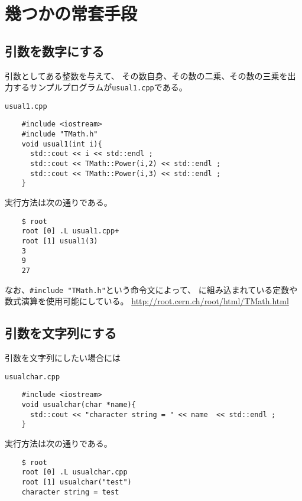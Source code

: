 \clearpage
 \section{幾つかの常套手段}


  \subsection{引数を数字にする}
  引数としてある整数を与えて、
  その数自身、その数の二乗、その数の三乗を出力するサンプルプログラムが\verb|usual1.cpp|である。
  \begin{itembox}{\texttt{usual1.cpp}}
\begin{verbatim}
	#include <iostream>
	#include "TMath.h"
	void usual1(int i){
	  std::cout << i << std::endl ;
	  std::cout << TMath::Power(i,2) << std::endl ;
	  std::cout << TMath::Power(i,3) << std::endl ;
	}
\end{verbatim}
  \end{itembox}
  実行方法は次の通りである。
\begin{verbatim}
	$ root
	root [0] .L usual1.cpp+
	root [1] usual1(3)
	3
	9
	27
\end{verbatim}
なお、\verb|#include "TMath.h"|という命令文によって、
\ROOT に組み込まれている定数や数式演算を使用可能にしている。
\url{http://root.cern.ch/root/html/TMath.html}


  \subsection{引数を文字列にする}
  引数を文字列にしたい場合には
  \begin{itembox}{\texttt{usualchar.cpp}}
\begin{verbatim}
	#include <iostream>
	void usualchar(char *name){
	  std::cout << "character string = " << name  << std::endl ;
	}
\end{verbatim}
  \end{itembox}
  実行方法は次の通りである。
\begin{verbatim}
	$ root
	root [0] .L usualchar.cpp 
	root [1] usualchar("test")
	character string = test
\end{verbatim}


